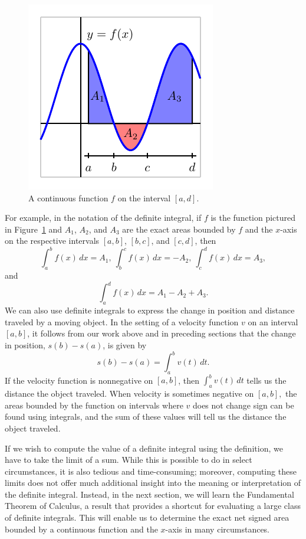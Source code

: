 \begin{figure}[h]
\begin{center}
\includegraphics{figures/4_3_DefIntInterp}
\caption{A continuous function $f$ on the interval $[a,d]$.} \label{F:4.3.DefIntInterp}
\end{center}
\end{figure}
For example, in the notation of the definite integral, if $f$ is the function pictured in Figure~\ref{F:4.3.DefIntInterp} and $A_1$, $A_2$, and $A_3$ are the exact areas bounded by $f$ and the $x$-axis on the respective intervals $[a,b]$, $[b,c]$, and $[c,d]$, then
$$\int_a^b f(x) \, dx = A_1, \ \int_b^c f(x) \, dx = -A_2, \ \int_c^d f(x) \, dx = A_3,$$
and
$$\int_a^d f(x) \, dx = A_1 - A_2 + A_3.$$
We can also use definite integrals to express the change in position and distance traveled by a moving object.  In the setting of a velocity function $v$ on an interval $[a,b]$, it follows from our work above and in preceding sections that the change in position, $s(b) - s(a)$, is given by
$$s(b) - s(a) = \int_a^b v(t) \, dt.$$
If the velocity function is nonnegative on $[a,b]$, then $\int_a^b v(t) \,dt$ tells us the distance the object traveled.  When velocity is sometimes negative on $[a,b],$ the areas bounded by the function on intervals where $v$ does not change sign can be found using integrals, and the sum of these values will tell us the distance the object traveled. 

If we wish to compute the value of a definite integral using the definition, we have to take the limit of a sum.  While this is possible to do in select circumstances, it is also tedious and time-consuming; moreover, computing these limits does not offer much additional insight into the meaning or interpretation of the definite integral.  Instead, in the next section, we will learn the Fundamental Theorem of Calculus, a result that provides a shortcut for evaluating a large class of definite integrals.  This will enable us to determine the exact net signed area bounded by a continuous function and the $x$-axis in many circumstances.

